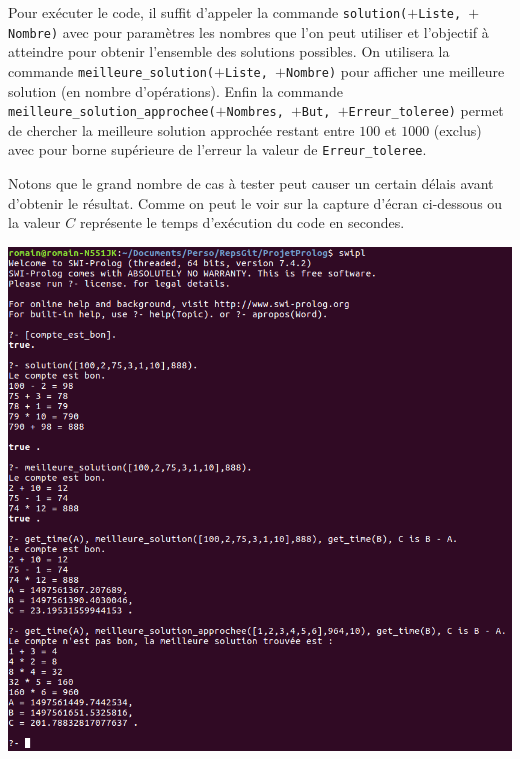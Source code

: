 \documentclass[12pt,a4paper]{article}
\begin{document}
Pour exécuter le code, il suffit d'appeler la commande \texttt{solution($+$Liste, $+$Nombre)} avec pour paramètres les nombres que l'on peut utiliser et l'objectif à atteindre pour obtenir l'ensemble des solutions possibles. On utilisera la commande \texttt{meilleure\_solution($+$Liste, $+$Nombre)} pour afficher une meilleure solution (en nombre d'opérations). Enfin la commande \texttt{meilleure\_solution\_approchee($+$Nombres, $+$But, $+$Erreur\_toleree)} permet de chercher la meilleure solution approchée restant entre $100$ et $1000$ (exclus) avec pour borne supérieure de l'erreur la valeur de \texttt{Erreur\_toleree}.

Notons que le grand nombre de cas à tester peut causer un certain délais avant d'obtenir le résultat. Comme on peut le voir sur la capture d'écran ci-dessous ou la valeur $C$ représente le temps d'exécution du code en secondes. 

\begin{center}
\includegraphics[width = 400pt]{SolutionCompteEstBon.png}
\end{center}
\end{document}
